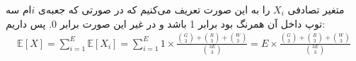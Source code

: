 متغیر تصادفی
$X_i$
را به این صورت تعریف می‌کنیم که در صورتی که جعبه‌ی
$i$ام
سه توپ داخل آن همرنگ بود برابر 1 باشد و در غیر این صورت برابر 0.
پس داریم:
\begin{gather*}
    \mathbb{E}[X] = \sum_{i=1}^E \mathbb{E}[X_i] = \sum_{i=1}^E 1 \times \frac{{G \choose 3} + {R \choose 3} + {W \choose 3}}{{3E \choose 3}}
    = E \times \frac{{G \choose 3} + {R \choose 3} + {W \choose 3}}{{3E \choose 3}}
\end{gather*}